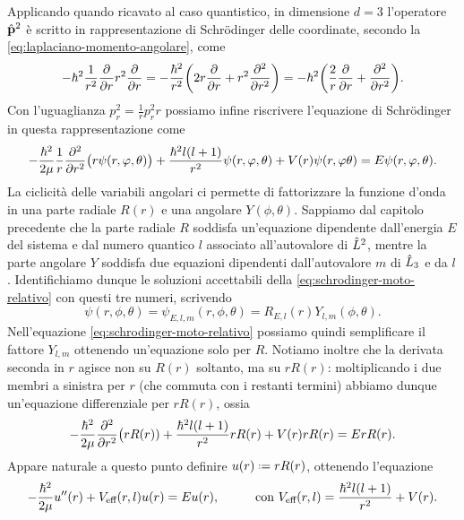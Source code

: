 Applicando quando ricavato al caso quantistico, in dimensione $d=3$ l'operatore $\hat{\mathbf{p}}^2$ è scritto in rappresentazione di Schr\"odinger delle coordinate, secondo la \eqref{eq:laplaciano-momento-angolare}, come
\begin{equation}
	-\hbar^2\frac1{r^2}\frac{\partial {}}{\partial {r}}r^2\frac{\partial {}}{\partial {r}}=-\frac{\hbar^2}{r^2}\bigg(2r\frac{\partial {}}{\partial {r}}+r^2\frac{\partial^2 {}}{\partial {r}^2}\bigg)=-\hbar^2\bigg(\frac2{r}\frac{\partial {}}{\partial {r}}+\frac{\partial^2 {}}{\partial {r}^2}\bigg).
\end{equation}
Con l'uguaglianza $p_r^2=\frac1{r}p_r^2r$ possiamo infine riscrivere l'equazione di Schr\"odinger in questa rappresentazione come
\begin{equation}
	-\frac{\hbar^2}{2\mu}\frac1{r}\frac{\partial^2 {}}{\partial {r}^2}\big(r\psi(r,\varphi,\theta)\big)+\frac{\hbar^2l(l+1)}{r^2}\psi(r,\varphi,\theta)+V(r)\psi(r,\varphi\theta)=E\psi(r,\varphi,\theta).
	\label{eq:schrodinger-moto-relativo}
\end{equation}
La ciclicità delle variabili angolari ci permette di fattorizzare la funzione d'onda in una parte radiale $R(r)$ e una angolare $Y(\phi,\theta)$.
Sappiamo dal capitolo precedente che la parte radiale $R$ soddisfa un'equazione dipendente dall'energia $E$ del sistema e dal numero quantico $l$ associato all'autovalore di $\hat{L}^2$, mentre la parte angolare $Y$ soddisfa due equazioni dipendenti dall'autovalore $m$ di $\hat{L}_3$ e da $l$.
Identifichiamo dunque le soluzioni accettabili della \eqref{eq:schrodinger-moto-relativo} con questi tre numeri, scrivendo
\begin{equation}
	\psi(r,\phi,\theta)=\psi_{E,l,m}(r,\phi,\theta)=R_{E,l}(r)Y_{l,m}(\phi,\theta).
	\label{eq:fattorizzazione-wf-radiale-angolare}
\end{equation}
Nell'equazione \eqref{eq:schrodinger-moto-relativo} possiamo quindi semplificare il fattore $Y_{l,m}$ ottenendo un'equazione solo per $R$.
Notiamo inoltre che la derivata seconda in $r$ agisce non su $R(r)$ soltanto, ma su $rR(r)$: moltiplicando i due membri a sinistra per $r$ (che commuta con i restanti termini) abbiamo dunque un'equazione differenziale per $rR(r)$, ossia
\begin{equation}
	-\frac{\hbar^2}{2\mu}\frac{\partial^2 {}}{\partial {r}^2}\big(rR(r))+\frac{\hbar^2l(l+1)}{r^2}rR(r)+V(r)rR(r)=ErR(r).
\end{equation}
Appare naturale a questo punto definire $u(r)\defeq rR(r)$, ottenendo l'equazione
\begin{equation}
	-\frac{\hbar^2}{2\mu}u''(r)+V_\textup{eff}(r,l)u(r)=Eu(r),\hspace{1cm}\text{con }V_\textup{eff}(r,l)=\frac{\hbar^2l(l+1)}{r^2}+V(r).
	\label{eq:schrodinger-moto-relativo-potenziale-efficace}
\end{equation}

